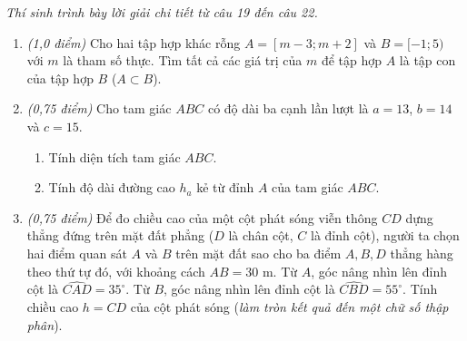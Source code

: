 \documentclass[12pt,a4paper]{article}
\newcommand{\parttitle}[1]{\par\vspace{2pt}{\large\bfseries\color{ink}#1}\par\vspace{1pt}}
\begin{document}
\parttitle{PHẦN IV. Tự luận}
\textit{Thí sinh trình bày lời giải chi tiết từ câu 19 đến câu 22.}
\begin{enumerate}[resume]
\item \textit{(1,0 điểm)} Cho hai tập hợp khác rỗng $A = [m - 3; m + 2]$ và $B = [-1; 5)$ với $m$ là tham số thực. Tìm tất cả các giá trị của $m$ để tập hợp $A$ là tập con của tập hợp $B$ ($A \subset B$).

\item \textit{(0,75 điểm)} Cho tam giác $ABC$ có độ dài ba cạnh lần lượt là $a = 13$, $b = 14$ và $c = 15$.
\begin{enumerate}
    \item Tính diện tích tam giác $ABC$.
    \item Tính độ dài đường cao $h_a$ kẻ từ đỉnh $A$ của tam giác $ABC$.
\end{enumerate}

\item \begin{minipage}[t]{0.58\linewidth}
\textit{(0,75 điểm)} Để đo chiều cao của một cột phát sóng viễn thông $CD$ dựng thẳng đứng trên mặt đất phẳng ($D$ là chân cột, $C$ là đỉnh cột), người ta chọn hai điểm quan sát $A$ và $B$ trên mặt đất sao cho ba điểm $A, B, D$ thẳng hàng theo thứ tự đó, với khoảng cách $AB = 30\text{ m}$. Từ $A$, góc nâng nhìn lên đỉnh cột là $\widehat{CAD} = 35^\circ$. Từ $B$, góc nâng nhìn lên đỉnh cột là $\widehat{CBD} = 55^\circ$. Tính chiều cao $h = CD$ của cột phát sóng (\textit{làm tròn kết quả đến một chữ số thập phân}).
\end{minipage}\hfill
\begin{minipage}[t]{0.38\linewidth}
\centering
{}
\end{minipage}


\end{enumerate}
\end{document}
